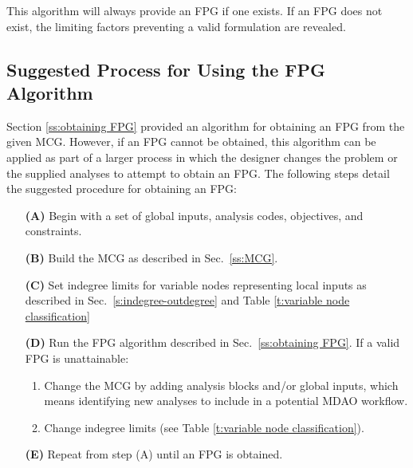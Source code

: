 This algorithm will always provide an FPG if one exists. If an FPG does not exist, the limiting factors preventing a valid formulation are revealed.

\subsection{Suggested Process for Using the FPG Algorithm}
\label{ss:process}
Section \ref{ss:obtaining FPG} provided an algorithm for obtaining an FPG from the given MCG. However, if an FPG cannot be obtained, this algorithm can be applied as part of a larger process in which the designer changes the problem or the supplied analyses to attempt to obtain an FPG. The following steps detail the suggested procedure for obtaining an FPG:
\begin{enumerate}
\item[\bf{(A)}] Begin with a set of global inputs, analysis codes, objectives, and constraints.
\item[\bf{(B)}] Build the MCG as described in Sec.~\ref{ss:MCG}.
\item[\bf{(C)}] Set indegree limits for variable nodes representing local inputs as described in Sec.~\ref{s:indegree-outdegree} and Table \ref{t:variable node classification}
\item[\bf{(D)}] Run the FPG algorithm described in Sec.~\ref{ss:obtaining FPG}. If a valid FPG is unattainable:
		\begin{enumerate}
\item Change the MCG by adding analysis blocks and/or global inputs, which means identifying new analyses to include in a potential MDAO workflow.
\item Change indegree limits (see Table \ref{t:variable node classification}).
\end{enumerate}
\item[\bf{(E)}] Repeat from step (A) until an FPG is obtained.
\end{enumerate}